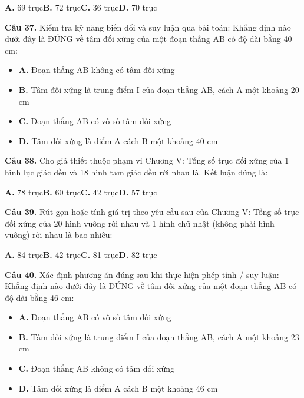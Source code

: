 \documentclass[11pt,a4paper]{article}
\begin{document}
\hspace*{1.5em}\textbf{A.} 69 trục\quad\quad \textbf{B.} 72 trục\quad\quad \textbf{C.} 36 trục\quad\quad \textbf{D.} 70 trục\par\vspace{2pt}
\textbf{\color{primary} Câu 37.} Kiểm tra kỹ năng biến đổi và suy luận qua bài toán: Khẳng định nào dưới đây là ĐÚNG về tâm đối xứng của một đoạn thẳng AB có độ dài bằng 40 cm:\par
\begin{itemize}\setlength{\itemsep}{1pt}\setlength{\parskip}{0pt}
  \item[] \textbf{A.} Đoạn thẳng AB không có tâm đối xứng
  \item[] \textbf{B.} Tâm đối xứng là trung điểm I của đoạn thẳng AB, cách A một khoảng 20 cm
  \item[] \textbf{C.} Đoạn thẳng AB có vô số tâm đối xứng
  \item[] \textbf{D.} Tâm đối xứng là điểm A cách B một khoảng 40 cm
\end{itemize}\vspace{2pt}
\textbf{\color{primary} Câu 38.} Cho giả thiết thuộc phạm vi Chương V: Tổng số trục đối xứng của 1 hình lục giác đều và 18 hình tam giác đều rời nhau là. Kết luận đúng là:\par
\hspace*{1.5em}\textbf{A.} 78 trục\quad\quad \textbf{B.} 60 trục\quad\quad \textbf{C.} 42 trục\quad\quad \textbf{D.} 57 trục\par\vspace{2pt}
\textbf{\color{primary} Câu 39.} Rút gọn hoặc tính giá trị theo yêu cầu sau của Chương V: Tổng số trục đối xứng của 20 hình vuông rời nhau và 1 hình chữ nhật (không phải hình vuông) rời nhau là bao nhiêu:\par
\hspace*{1.5em}\textbf{A.} 84 trục\quad\quad \textbf{B.} 42 trục\quad\quad \textbf{C.} 81 trục\quad\quad \textbf{D.} 82 trục\par\vspace{2pt}
\textbf{\color{primary} Câu 40.} Xác định phương án đúng sau khi thực hiện phép tính / suy luận: Khẳng định nào dưới đây là ĐÚNG về tâm đối xứng của một đoạn thẳng AB có độ dài bằng 46 cm:\par
\begin{itemize}\setlength{\itemsep}{1pt}\setlength{\parskip}{0pt}
  \item[] \textbf{A.} Đoạn thẳng AB có vô số tâm đối xứng
  \item[] \textbf{B.} Tâm đối xứng là trung điểm I của đoạn thẳng AB, cách A một khoảng 23 cm
  \item[] \textbf{C.} Đoạn thẳng AB không có tâm đối xứng
  \item[] \textbf{D.} Tâm đối xứng là điểm A cách B một khoảng 46 cm
\end{itemize}\vspace{2pt}
\end{document}
